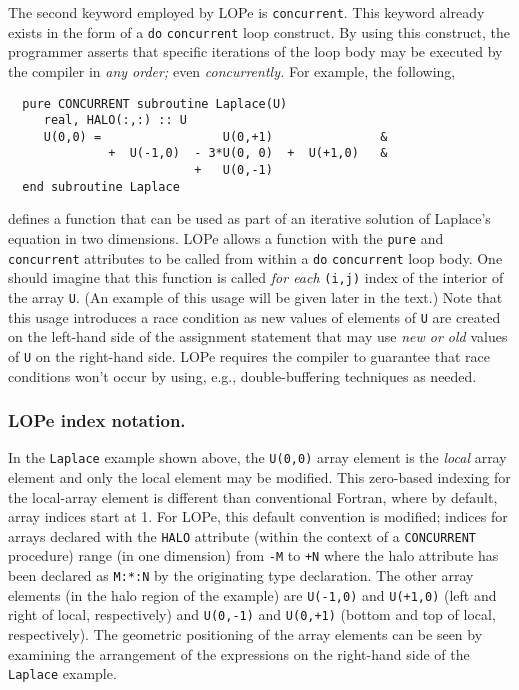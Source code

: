 The second keyword employed by LOPe is \texttt{concurrent}.  This keyword already exists in the form
of a \texttt{do} \texttt{concurrent} loop construct.  By using this construct, the programmer
asserts that specific iterations of the loop body may be executed by the compiler in \emph{any
  order;} even \emph{concurrently.}
For example, the following,
\begin{verbatim}
  pure CONCURRENT subroutine Laplace(U)
     real, HALO(:,:) :: U
     U(0,0) =                 U(0,+1)               &
              +  U(-1,0)  - 3*U(0, 0)  +  U(+1,0)   &
                          +   U(0,-1)
  end subroutine Laplace
\end{verbatim}
defines a function that can be used as part of an iterative solution of Laplace's equation in two
dimensions.  LOPe allows a function with the \texttt{pure} and \texttt{concurrent} attributes to be
called from within a \texttt{do} \texttt{concurrent} loop body.  One should imagine that this
function is called \emph{for each} \texttt{(i,j)} index of the interior of the array \texttt{U}.
(An example of this usage will be given later in the text.)  Note that this usage introduces a race
condition as new values of elements of \texttt{U} are created on the left-hand side of the
assignment statement that may use \emph{new or old} values of \texttt{U} on the right-hand side.
LOPe requires the compiler to guarantee that race conditions won't occur by using, e.g.,
double-buffering techniques as needed.

\subsubsection{LOPe index notation.}
In the \texttt{Laplace} example shown above, the \texttt{U(0,0)} array element is the \emph{local}
array element and only the local element may be modified.  This zero-based indexing for the
local-array element is different than conventional Fortran, where by default, array indices start at
1.  For LOPe, this default convention is modified; indices for arrays declared with the
\texttt{HALO} attribute (within the context of a \texttt{CONCURRENT} procedure) range (in one
dimension) from \texttt{-M} to \texttt{+N} where the halo attribute has been declared as
\texttt{M:*:N} by the originating type declaration.  The other array elements (in the halo region of
the example) are \texttt{U(-1,0)} and \texttt{U(+1,0)} (left and right of local, respectively) and
\texttt{U(0,-1)} and \texttt{U(0,+1)} (bottom and top of local, respectively).  The geometric
positioning of the array elements can be seen by examining the arrangement of the expressions on the
right-hand side of the \texttt{Laplace} example.
